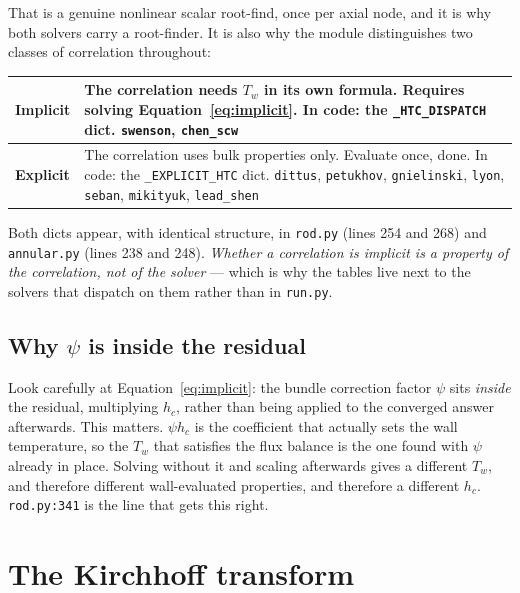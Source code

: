 \documentclass[11pt]{article}
\newcommand{\code}[1]{\texttt{#1}}
\begin{document}
That is a genuine nonlinear scalar root-find, once per axial node, and it is why both
solvers carry a root-finder. It is also why the module distinguishes two classes of
correlation throughout:

\begin{center}
\begin{tabular}{lp{9.2cm}}
\toprule
\textbf{Implicit} & The correlation needs $T_w$ in its own formula. Requires solving
Equation~\eqref{eq:implicit}. In code: the \code{\_HTC\_DISPATCH} dict.
\newline \code{swenson}, \code{chen\_scw} \\
\midrule
\textbf{Explicit} & The correlation uses bulk properties only. Evaluate once, done. In
code: the \code{\_EXPLICIT\_HTC} dict.
\newline \code{dittus}, \code{petukhov}, \code{gnielinski}, \code{lyon}, \code{seban},
\code{mikityuk}, \code{lead\_shen} \\
\bottomrule
\end{tabular}
\end{center}

Both dicts appear, with identical structure, in \code{rod.py} (lines 254 and 268) and
\code{annular.py} (lines 238 and 248). \emph{Whether a correlation is implicit is a
property of the correlation, not of the solver} --- which is why the tables live next to
the solvers that dispatch on them rather than in \code{run.py}.

\subsection{Why $\psi$ is inside the residual}

Look carefully at Equation~\eqref{eq:implicit}: the bundle correction factor $\psi$ sits
\emph{inside} the residual, multiplying $h_c$, rather than being applied to the
converged answer afterwards. This matters. $\psi h_c$ is the coefficient that actually
sets the wall temperature, so the $T_w$ that satisfies the flux balance is the one found
with $\psi$ already in place. Solving without it and scaling afterwards gives a
different $T_w$, and therefore different wall-evaluated properties, and therefore a
different $h_c$. \code{rod.py:341} is the line that gets this right.

\section{The Kirchhoff transform}
\label{sec:kirchhoff}
\end{document}
